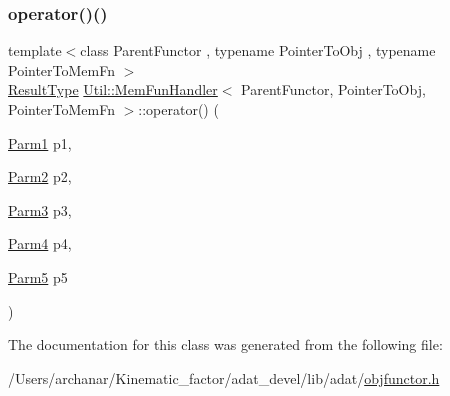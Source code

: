\subsubsection{\texorpdfstring{operator()()}{operator()()}\hspace{0.1cm}{\footnotesize\ttfamily [12/12]}}
{\footnotesize\ttfamily template$<$class Parent\+Functor , typename Pointer\+To\+Obj , typename Pointer\+To\+Mem\+Fn $>$ \\
\mbox{\hyperlink{classUtil_1_1MemFunHandler_a093690dcced95ad48c5429e50006c83e}{Result\+Type}} \mbox{\hyperlink{classUtil_1_1MemFunHandler}{Util\+::\+Mem\+Fun\+Handler}}$<$ Parent\+Functor, Pointer\+To\+Obj, Pointer\+To\+Mem\+Fn $>$\+::operator() (\begin{DoxyParamCaption}\item[{\mbox{\hyperlink{classUtil_1_1MemFunHandler_a43182733677fc623d89e5613ecf15761}{Parm1}}}]{p1,  }\item[{\mbox{\hyperlink{classUtil_1_1MemFunHandler_a9d454c62047cb4bff3173b5bda9a38c8}{Parm2}}}]{p2,  }\item[{\mbox{\hyperlink{classUtil_1_1MemFunHandler_a6cbef94d16f4d6b29d6a8a90afbeff4f}{Parm3}}}]{p3,  }\item[{\mbox{\hyperlink{classUtil_1_1MemFunHandler_a1e5a0cf582f3b540e409d333ae06a4bd}{Parm4}}}]{p4,  }\item[{\mbox{\hyperlink{classUtil_1_1MemFunHandler_a70d588c17500255eb899788aa0e6c29d}{Parm5}}}]{p5 }\end{DoxyParamCaption})\hspace{0.3cm}{\ttfamily [inline]}}



The documentation for this class was generated from the following file\+:\begin{DoxyCompactItemize}
\item 
/\+Users/archanar/\+Kinematic\+\_\+factor/adat\+\_\+devel/lib/adat/\mbox{\hyperlink{lib_2adat_2objfunctor_8h}{objfunctor.\+h}}\end{DoxyCompactItemize}
